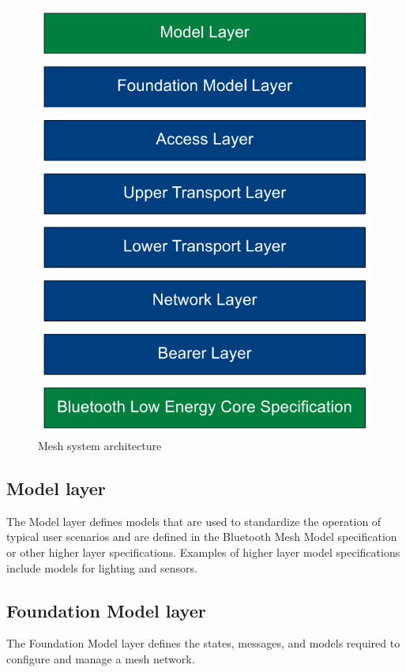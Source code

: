 \documentclass[\main/main.tex]{subfiles}
\begin{document}
\begin{figure}[H]
    \begin{center}
        \includegraphics[scale=0.25]{ble_mesh_layered_architecture.png}
    \end{center}
    \caption{Mesh system architecture}
    \label{fig:ble_mesh_layered_architecture}
\end{figure}

\subsection{Model layer}
The Model layer defines models that are used to standardize the operation of typical user scenarios and are defined in the Bluetooth Mesh Model specification or other higher layer specifications. Examples of higher layer model specifications include models for lighting and sensors.
\subsection{Foundation Model layer}
The Foundation Model layer defines the states, messages, and models required to configure and manage a mesh network.
\end{document}
